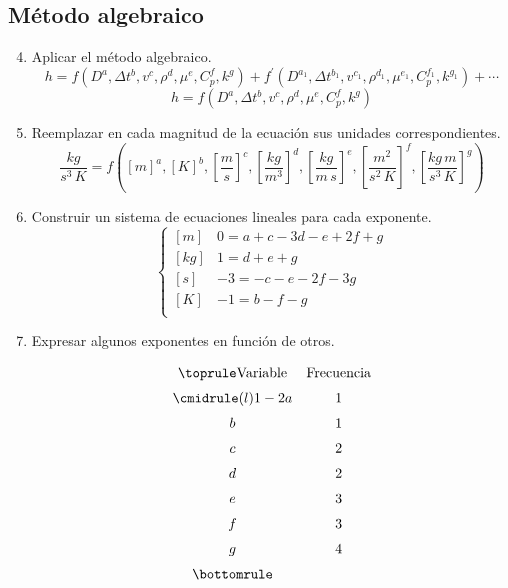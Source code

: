 \subsection{Método algebraico}
\begin{enumerate}
    \setcounter{enumi}{3}
    \item Aplicar el método algebraico.
        \begin{equation*}
            h = f(D^a,\Delta{t}^b,v^c,\rho^d,\mu^e,C_p^f,k^g)+
                f^{'}(
                    D^{a_1},\Delta{t}^{b_1},v^{c_1},
                    \rho^{d_1},\mu^{e_1},C_p^{f_1},k^{g_1}
                )+
                \cdots
        \end{equation*}
        \begin{equation}
            h = f(D^a,\Delta{t}^b,v^c,\rho^d,\mu^e,C_p^f,k^g)
            \label{algebraico}
        \end{equation}
    \item Reemplazar en cada magnitud de la ecuación sus unidades
        correspondientes.
        \begin{equation*}
            \frac{kg}{s^3\,K} = f\left(
                [m]^a,[K]^b,\left[\frac{m}{s}\right]^c,
                \left[\frac{kg}{m^3}\right]^d,\left[\frac{kg}{m\,s}\right]^e,
                \left[\frac{m^2}{s^2\,K}\right]^f,
                \left[\frac{kg\,m}{s^3\,K}\right]^g\right)
        \end{equation*}
    \item Construir un sistema de ecuaciones lineales para cada exponente.
        \begin{equation}
            \begin{cases}
                [m] & 0 = a + c - 3d - e + 2f + g \\
                [kg] & 1 = d + e +g \\
                [s] & -3 = -c - e - 2f -3g \\
                [K] & -1 = b - f - g \\
            \end{cases}
        \end{equation}
    \item Expresar algunos exponentes en función de otros.
        \begin{equation*}
        \def\arraystretch{1.5}
        \begin{array}{@{}cc@{}}
        \toprule
        \text{Variable} & \text{Frecuencia} \\
        \cmidrule(l){1-2}
        a & 1 \\
        b & 1 \\
        c & 2 \\
        d & 2 \\
        e & 3 \\
        f & 3 \\
        g & 4 \\
        \bottomrule
        \end{array}
        \end{equation*}


\end{enumerate}
